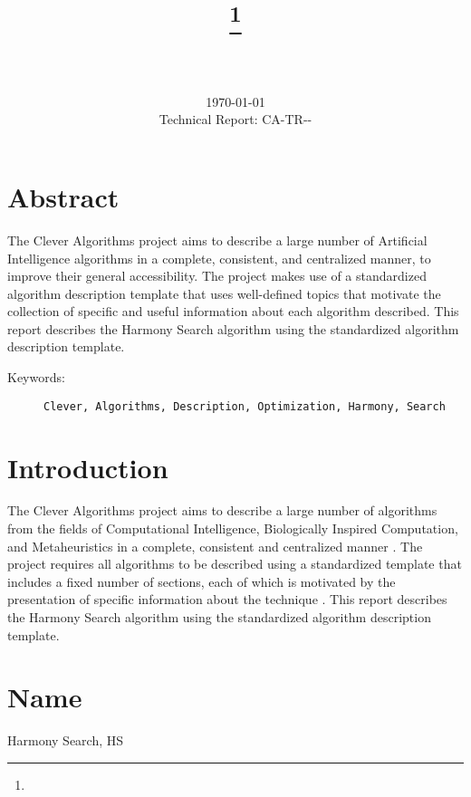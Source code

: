 \documentclass[a4paper, 11pt]{article}
\title{{\myreporttitle}\footnote{\myreportlicense}}
\author{\myreportauthor\\{\myreportemail}\\\small\myreportproject}
\date{\today\\{\small{Technical Report: CA-TR-{\myreportdate}-\myreportversion}}}
\begin{document}
\maketitle

\section*{Abstract} 
The Clever Algorithms project aims to describe a large number of Artificial Intelligence algorithms in a complete, consistent, and centralized manner, to improve their general accessibility. 
The project makes use of a standardized algorithm description template that uses well-defined topics that motivate the collection of specific and useful information about each algorithm described.
This report describes the Harmony Search algorithm using the standardized algorithm description template.

\begin{description}
	\item[Keywords:] {\small\texttt{Clever, Algorithms, Description, Optimization, Harmony, Search}}
\end{description} 

\section{Introduction} 
\label{sec:intro}
The Clever Algorithms project aims to describe a large number of algorithms from the fields of Computational Intelligence, Biologically Inspired Computation, and Metaheuristics in a complete, consistent and centralized manner \cite{Brownlee2010}.
The project requires all algorithms to be described using a standardized template that includes a fixed number of sections, each of which is motivated by the presentation of specific information about the technique \cite{Brownlee2010a}.
This report describes the Harmony Search algorithm using the standardized algorithm description template.

\section{Name} 
\label{sec:name}
Harmony Search, HS
\end{document}
